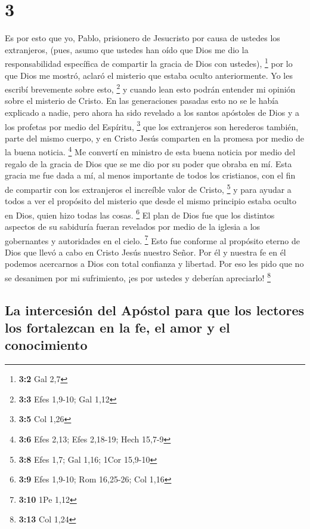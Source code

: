 \hypertarget{section-2}{%
\section{3}\label{section-2}}

 Es por esto que yo, Pablo, prisionero de Jesucristo por
causa de ustedes los extranjeros,  (pues, asumo que
ustedes han oído que Dios me dio la responsabilidad específica de
compartir la gracia de Dios con ustedes), \footnote{\textbf{3:2} Gal 2,7}
 por lo que Dios me mostró, aclaró el misterio que estaba
oculto anteriormente. Yo les escribí brevemente sobre esto, \footnote{\textbf{3:3}
  Efes 1,9-10; Gal 1,12}  y cuando lean esto podrán
entender mi opinión sobre el misterio de Cristo.  En las
generaciones pasadas esto no se le había explicado a nadie, pero ahora
ha sido revelado a los santos apóstoles de Dios y a los profetas por
medio del Espíritu, \footnote{\textbf{3:5} Col 1,26}  que
los extranjeros son herederos también, parte del mismo cuerpo, y en
Cristo Jesús comparten en la promesa por medio de la buena noticia.
\footnote{\textbf{3:6} Efes 2,13; Efes 2,18-19; Hech 15,7-9}
 Me convertí en ministro de esta buena noticia por medio
del regalo de la gracia de Dios que se me dio por su poder que obraba en
mí.  Esta gracia me fue dada a mí, al menos importante de
todos los cristianos, con el fin de compartir con los extranjeros el
increíble valor de Cristo, \footnote{\textbf{3:8} Efes 1,7; Gal 1,16;
  1Cor 15,9-10}  y para ayudar a todos a ver el propósito
del misterio que desde el mismo principio estaba oculto en Dios, quien
hizo todas las cosas. \footnote{\textbf{3:9} Efes 1,9-10; Rom 16,25-26;
  Col 1,16}  El plan de Dios fue que los distintos
aspectos de su sabiduría fueran revelados por medio de la iglesia a los
gobernantes y autoridades en el cielo. \footnote{\textbf{3:10} 1Pe 1,12}
 Esto fue conforme al propósito eterno de Dios que llevó
a cabo en Cristo Jesús nuestro Señor.  Por él y nuestra
fe en él podemos acercarnos a Dios con total confianza y libertad.
 Por eso les pido que no se desanimen por mi sufrimiento,
¡es por ustedes y deberían apreciarlo! \footnote{\textbf{3:13} Col 1,24}

\hypertarget{la-intercesiuxf3n-del-apuxf3stol-para-que-los-lectores-los-fortalezcan-en-la-fe-el-amor-y-el-conocimiento}{%
\subsection{La intercesión del Apóstol para que los lectores los
fortalezcan en la fe, el amor y el
conocimiento}\label{la-intercesiuxf3n-del-apuxf3stol-para-que-los-lectores-los-fortalezcan-en-la-fe-el-amor-y-el-conocimiento}}

